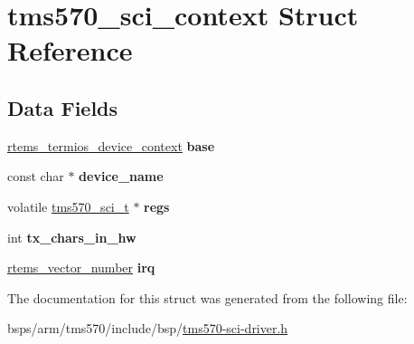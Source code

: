 \hypertarget{structtms570__sci__context}{}\section{tms570\+\_\+sci\+\_\+context Struct Reference}
\label{structtms570__sci__context}
\subsection*{Data Fields}
\begin{DoxyCompactItemize}
\item 
\mbox{\label{structtms570__sci__context_a918d71d4ae209921f66fce7ab77dc40d}} 
\mbox{\hyperlink{structrtems__termios__device__context}{rtems\+\_\+termios\+\_\+device\+\_\+context}} {\bfseries base}
\item 
\mbox{\label{structtms570__sci__context_aed70a419225e7d8d53d6325319b506fa}} 
const char $\ast$ {\bfseries device\+\_\+name}
\item 
\mbox{\label{structtms570__sci__context_a62540e99f39bd1839b9f944456011a19}} 
volatile \mbox{\hyperlink{structtms570__sci__t}{tms570\+\_\+sci\+\_\+t}} $\ast$ {\bfseries regs}
\item 
\mbox{\label{structtms570__sci__context_a2d0d55b4a53301a25f1f45b357d0e08e}} 
int {\bfseries tx\+\_\+chars\+\_\+in\+\_\+hw}
\item 
\mbox{\label{structtms570__sci__context_a65530549e0070865a4367b58a41c2c5e}} 
\mbox{\hyperlink{group__ClassicINTR_ga3e434c197d99f128e78cae4d9358bd8b}{rtems\+\_\+vector\+\_\+number}} {\bfseries irq}
\end{DoxyCompactItemize}


The documentation for this struct was generated from the following file\+:\begin{DoxyCompactItemize}
\item 
bsps/arm/tms570/include/bsp/\mbox{\hyperlink{tms570-sci-driver_8h}{tms570-\/sci-\/driver.\+h}}\end{DoxyCompactItemize}
